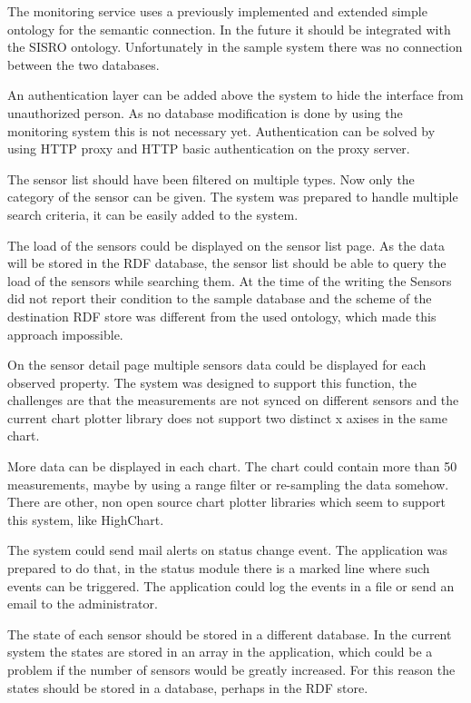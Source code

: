 The monitoring service uses a previously implemented and extended simple ontology for the semantic connection. In the future it should be integrated with the SISRO ontology. Unfortunately in the sample system there was no connection between the two databases.

An authentication layer can be added above the system to hide the interface from unauthorized person. As no database modification is done by using the monitoring system this is not necessary yet. Authentication can be solved by using HTTP proxy and HTTP basic authentication on the proxy server.

The sensor list should have been filtered on multiple types. Now only the category of the sensor can be given. The system was prepared to handle multiple search criteria, it can be easily added to the system.

The load of the sensors could be displayed on the sensor list page. As the data will be stored in the RDF database, the sensor list should be able to query the load of the sensors while searching them. At the time of the writing the Sensors did not report their condition to the sample database and the scheme of the destination RDF store was different from the used ontology, which made this approach impossible.

On the sensor detail page multiple sensors data could be displayed for each observed property. The system was designed to support this function, the challenges are that the measurements are not synced on different sensors and the current chart plotter library does not support two distinct x axises in the same chart. 

More data can be displayed in each chart. The chart could contain more than 50 measurements, maybe by using a range filter or re-sampling the data somehow. There are other, non open source chart plotter libraries which seem to support this system, like HighChart.

The system could send mail alerts on status change event. The application was prepared to do that, in the status module there is a marked line where such events can be triggered. The application could log the events in a file or send an email to the administrator.

The state of each sensor should be stored in a different database. In the current system the states are stored in an array in the application, which could be a problem if the number of sensors would be greatly increased. For this reason the states should be stored in a database, perhaps in the RDF store.

